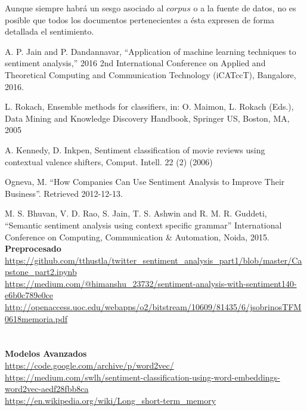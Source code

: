 \documentclass[a4paper,12pt]{report}
\begin{document}
Aunque siempre habrá un sesgo asociado al $corpus$ o a la fuente de datos, no es posible que todos los documentos pertenecientes a ésta expresen de forma detallada el sentimiento. 


\begin{thebibliography}{0}

 A. P. Jain and P. Dandannavar, ``Application of machine learning techniques to sentiment analysis,'' 2016 2nd International Conference on Applied and Theoretical Computing and Communication Technology (iCATccT), Bangalore, 2016.

 L. Rokach, Ensemble methods for classifiers, in: O. Maimon, L. Rokach (Eds.), Data Mining and Knowledge Discovery Handbook, Springer US, Boston,
MA, 2005

 A. Kennedy, D. Inkpen, Sentiment classification of movie reviews using contextual valence shifters, Comput. Intell. 22 (2) (2006)

 Ogneva, M. ``How Companies Can Use Sentiment Analysis to Improve
Their Business''. Retrieved 2012-12-13.

 M. S. Bhuvan, V. D. Rao, S. Jain, T. S. Ashwin and R. M. R. Guddeti, ``Semantic sentiment analysis using context specific grammar'' International Conference on Computing, Communication \& Automation, Noida, 2015.
\vspace{6mm}\\
\textbf{Preprocesado}
\vspace{2mm}
\\\url{https://github.com/tthustla/twitter_sentiment_analysis_part1/blob/master/Capstone_part2.ipynb}
\vspace{2mm}
\\\url{https://medium.com/@himanshu_23732/sentiment-analysis-with-sentiment140-e6b0c789e0ce}
\vspace{2mm}
\\\url{http://openaccess.uoc.edu/webapps/o2/bitstream/10609/81435/6/jsobrinosTFM0618memoria.pdf}
\vspace{2mm}
\\\url{}
\vspace{2mm}\\
\\\textbf{Modelos Avanzados}
\vspace{2mm}
\\\url{https://code.google.com/archive/p/word2vec/}
\vspace{2mm}
\\\url{https://medium.com/swlh/sentiment-classification-using-word-embeddings-word2vec-aedf28fbb8ca}
\vspace{2mm}
\\\url{https://en.wikipedia.org/wiki/Long_short-term_memory}
\vspace{2mm}

  
\end{thebibliography}
\end{document}
